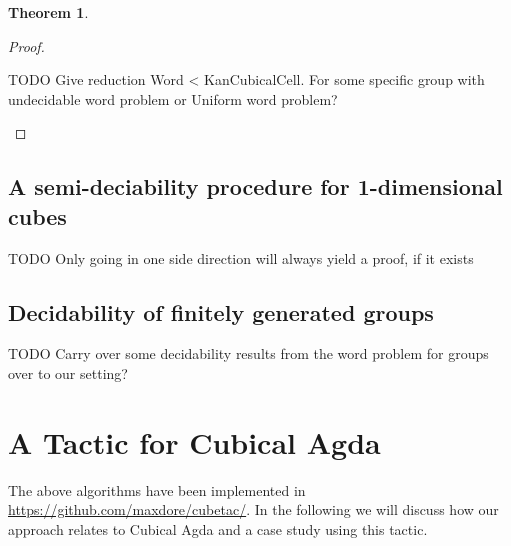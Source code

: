 \documentclass[11pt]{article}
\theoremstyle{definition}
\newtheorem{theorem}{Theorem}
\newcommand{\todo}[1]{
  \begin{tcolorbox}
    TODO {#1} 
  \end{tcolorbox}
}
\newcommand{\join}{\wedge}
\newcommand{\meet}{\vee}
\newcommand{\cset}[1]{\ensuremath{\mathsf{{#1}}}}
\begin{document}
\begin{theorem}
\begin{proof}


    \todo{Give reduction Word < KanCubicalCell. For some specific group with
      undecidable word problem or Uniform word problem? }
\end{proof}
\end{theorem}


\subsection{A semi-deciability procedure for 1-dimensional cubes}

\todo{Only going in one side direction will always yield a proof, if it exists}

\subsection{Decidability of finitely generated groups}

\todo{Carry over some decidability results from the word problem for groups over
to our setting?}





\section{A Tactic for Cubical Agda}
\label{sec:cubicalagda}

The above algorithms have been implemented in
\url{https://github.com/maxdore/cubetac/}. In the following we will discuss how
our approach relates to Cubical Agda and a case study using this tactic.


\end{document}
